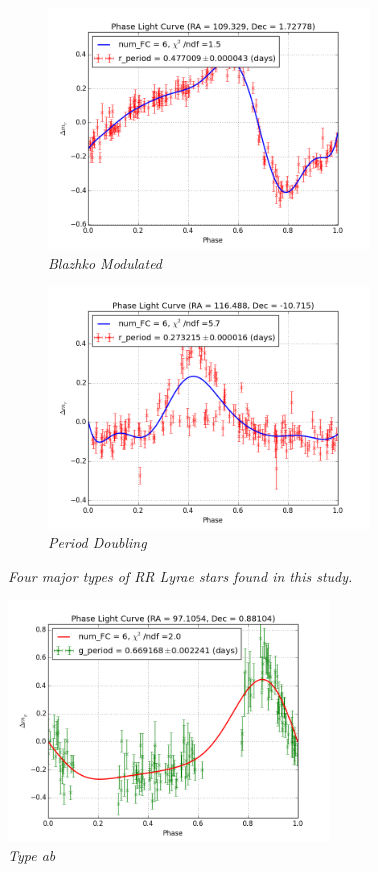 \documentclass[aps,prb,twocolumn,superscriptaddress]{revtex4-1}
\begin{document}
\begin{figure}
	\begin{subfigure}{.5\textwidth}
	  \centering
			\includegraphics[width=3.35in]{figures/rPLCneg45E_limit2_grp_109+01_09693.png}
		\caption{\it \small{Blazhko Modulated \citep{RRLyrae}}}
		\label{fig:Tc}
	\end{subfigure}%
	\begin{subfigure}{.5\textwidth}
	  \centering
			\includegraphics[width=3.35in]{figures/rPLCneg45E_limit2_grp_116-11_03117.png}
		\caption{\it \small{Period Doubling}}
		\label{fig:Tc}
	\end{subfigure}%
	\caption{\it \small{Four major types of RR Lyrae stars found in this study. }}
	\label{fig:Type}
\end{figure}


	\begin{figure}[!]
	 \centering
	 	\includegraphics[width=3.35in]{figures/FSP1_g_LC_rrrtest_p5_grp19.png}
	 \caption{\it \small{Type ab}}
	 \label{fig:Typeab}
	\end{figure}
\end{document}
